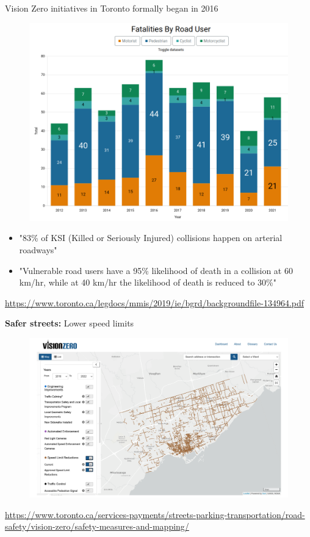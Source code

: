 \documentclass[aspectratio=169]{beamer}
\begin{document}
\begin{frame}
	
	Vision Zero initiatives in Toronto formally began in 2016
		
	\begin{figure}
		\centering
		\includegraphics[width=0.55\linewidth]{images/vision_zero_deaths.png}
		
	\end{figure}

	\small
	\begin{itemize}
		\item "83\% of KSI (Killed or Seriously Injured) collisions happen on arterial roadways"
		\item "Vulnerable road users have a 95\% likelihood of death
		in a collision at 60 km/hr, while at 40 km/hr the likelihood of death is reduced to 30\%"
	\end{itemize}

	\tiny{\url{https://www.toronto.ca/legdocs/mmis/2019/ie/bgrd/backgroundfile-134964.pdf}}
	
\end{frame}




\begin{frame}
	
	\textbf{Safer streets:} Lower speed limits
	
	\begin{figure}
		\centering
		\includegraphics[width=0.75\linewidth]{images/speed_limit_reduction.png}
	\end{figure}

	\tiny\url{https://www.toronto.ca/services-payments/streets-parking-transportation/road-safety/vision-zero/safety-measures-and-mapping/}
	
\end{frame}
\end{document}
